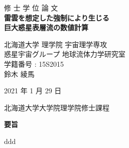 \documentclass[a4j,12pt,openbib,oneside]{jreport}
\begin{document}
\begin{titlepage}
 \centering
 \vspace*{40truept}
 {\Huge 修 \hspace{10pt} 士 \hspace{10pt} 学 \hspace{10pt} 位
 \hspace{10pt} 論 \hspace{10pt} 文}\\  %
 \vspace*{50truept}
 \textbf{{\Huge 雷雲を想定した強制により生じる\\
巨大惑星表層流の数値計算}} \\ %
 \vspace{30truept}
 \vspace{150truept}
 \begin{center}
  {\Large 北海道大学 理学院 宇宙理学専攻}
  \vspace{10truept}\\
  {\Large 惑星宇宙グループ 地球流体力学研究室}
  \vspace{10truept}\\
  {\Large 学籍番号 : 15S2015} 
  \vspace{30truept}\\
  {\LARGE 鈴木 綾馬}
  \vspace{10truept}
 \end{center}
 \begin{center}
  {\Large 2021 年 1 月 29 日}
 \end{center}
 \vspace{50truept}
 {\Large 北海道大学大学院理学院修士課程} \\
\end{titlepage}


\thispagestyle{empty}
\setcounter{page}{0}

\clearpage
\begin{center}
\large{\bf 要旨}
\end{center}
\thispagestyle{empty}
\setcounter{page}{0}
ddd

\clearpage
\thispagestyle{empty}
\setcounter{page}{0}
\tableofcontents 
\thispagestyle{empty}
\setcounter{page}{0}

\clearpage
\setcounter{table}{0}
\setcounter{figure}{0}
\end{document}
